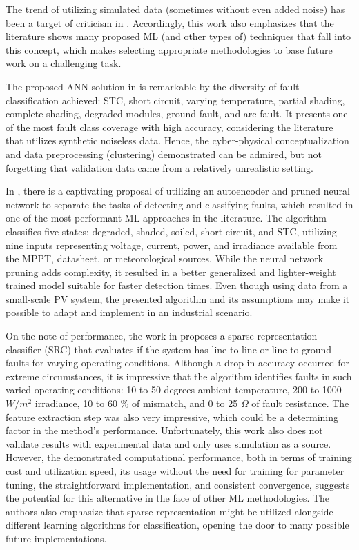 The trend of utilizing simulated data (sometimes without even added noise) has been a target of criticism in \cite{Aziz2020}. Accordingly, this work also emphasizes that the literature shows many proposed ML (and other types of) techniques that fall into this concept, which makes selecting appropriate methodologies to base future work on a challenging task.

The proposed ANN solution in \cite{Rao2019} is remarkable by the diversity of fault classification achieved: STC, short circuit, varying temperature, partial shading, complete shading, degraded modules, ground fault, and arc fault. It presents one of the most fault class coverage with high accuracy, considering the literature that utilizes synthetic noiseless data. Hence, the cyber-physical conceptualization and data preprocessing (clustering) demonstrated can be admired, but not forgetting that validation data came from a relatively unrealistic setting. 

In \cite{Rao2021}, there is a captivating proposal of utilizing an autoencoder and pruned neural network to separate the tasks of detecting and classifying faults, which resulted in one of the most performant ML approaches in the literature. The algorithm classifies five states: degraded, shaded, soiled, short circuit, and STC, utilizing nine inputs representing voltage, current, power, and irradiance available from the MPPT, datasheet, or meteorological sources. While the neural network pruning adds complexity, it resulted in a better generalized and lighter-weight trained model suitable for faster detection times. Even though using data from a small-scale PV system, the presented algorithm and its assumptions may make it possible to adapt and implement in an industrial scenario.

On the note of performance, the work in \cite{Kilic2020} proposes a sparse representation classifier (SRC) that evaluates if the system has line-to-line or line-to-ground faults for varying operating conditions. Although a drop in accuracy occurred for extreme circumstances, it is impressive that the algorithm identifies faults in such varied operating conditions: 10 to 50 degrees ambient temperature, 200 to 1000 $W/m^2$ irradiance, 10 to 60 \% of mismatch, and 0 to 25 $\Omega$ of fault resistance. The feature extraction step was also very impressive, which could be a determining factor in the method's performance. Unfortunately, this work also does not validate results with experimental data and only uses simulation as a source. However, the demonstrated computational performance, both in terms of training cost and utilization speed, its usage without the need for training for parameter tuning, the straightforward implementation, and consistent convergence, suggests the potential for this alternative in the face of other ML methodologies. The authors also emphasize that sparse representation might be utilized alongside different learning algorithms for classification, opening the door to many possible future implementations.

